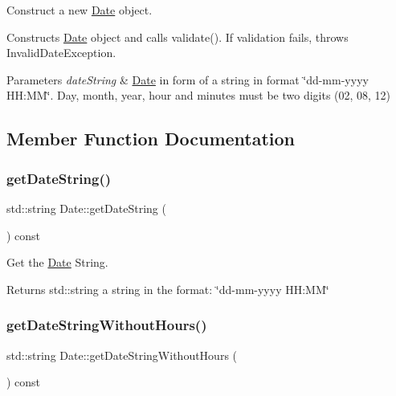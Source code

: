 Construct a new \mbox{\hyperlink{classDate}{Date}} object. 

Constructs \mbox{\hyperlink{classDate}{Date}} object and calls validate(). If validation fails, throws Invalid\+Date\+Exception.


\begin{DoxyParams}{Parameters}
{\em date\+String} & \mbox{\hyperlink{classDate}{Date}} in form of a string in format \char`\"{}dd-\/mm-\/yyyy H\+H\+:\+M\+M\char`\"{}. Day, month, year, hour and minutes must be two digits (\textquotesingle{}02\textquotesingle{}, \textquotesingle{}08\textquotesingle{}, \textquotesingle{}12\textquotesingle{}) \\
\hline
\end{DoxyParams}


\subsection{Member Function Documentation}
\mbox{\label{classDate_a733c89177097f0d7f5cc2f68f5593856}} 
\subsubsection{\texorpdfstring{get\+Date\+String()}{getDateString()}}
{\footnotesize\ttfamily std\+::string Date\+::get\+Date\+String (\begin{DoxyParamCaption}{ }\end{DoxyParamCaption}) const}



Get the \mbox{\hyperlink{classDate}{Date}} String. 

\begin{DoxyReturn}{Returns}
std\+::string a string in the format\+: \char`\"{}dd-\/mm-\/yyyy H\+H\+:\+M\+M\char`\"{} 
\end{DoxyReturn}
\mbox{\label{classDate_a54b53336c8ba897fae4d2bbb0aa84a99}} 
\subsubsection{\texorpdfstring{get\+Date\+String\+Without\+Hours()}{getDateStringWithoutHours()}}
{\footnotesize\ttfamily std\+::string Date\+::get\+Date\+String\+Without\+Hours (\begin{DoxyParamCaption}{ }\end{DoxyParamCaption}) const}



